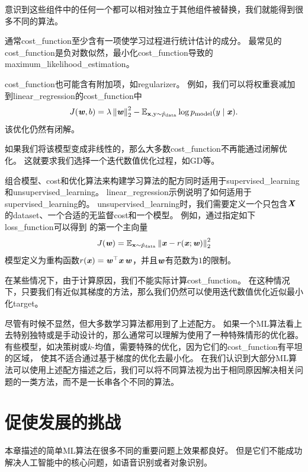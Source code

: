意识到这些组件中的任何一个都可以相对独立于其他组件被替换，我们就能得到很多不同的算法。


通常\gls{cost_function}至少含有一项使学习过程进行统计估计的成分。
最常见的\gls{cost_function}是负对数似然，最小化\gls{cost_function}导致的\gls{maximum_likelihood_estimation}。

\gls{cost_function}也可能含有附加项，如\gls{regularizer}。
例如，我们可以将权重衰减加到\gls{linear_regression}的\gls{cost_function}中
\begin{equation}
    J(\boldsymbol{\mathit{w}}, b) = \lambda \left\lVert\boldsymbol{\mathit{w}}\right\rVert_2^2 - \mathbb{E}_{\mathbf{x},\mathrm{y}\sim \hat{p}_{\text{data}}}
    \log p_{\text{model}} (y \mid \boldsymbol{\mathit{x}}) .
\end{equation}
该优化仍然有闭解。

如果我们将该模型变成非线性的，那么大多数\gls{cost_function}不再能通过闭解优化。
这就要求我们选择一个迭代数值优化过程，如\gls{GD}等。

组合模型、\gls{cost}和优化算法来构建学习算法的配方同时适用于\gls{supervised_learning}和\gls{unsupervised_learning}。
\gls{linear_regression}示例说明了如何适用于\gls{supervised_learning}的。
\gls{unsupervised_learning}时，我们需要定义一个只包含$\boldsymbol{\mathit{X}}$的\gls{dataset}、一个合适的无监督\gls{cost}和一个模型。
例如，通过指定如下\gls{loss_function}可以得到\,\,的第一个主向量
\begin{equation}
    J(\boldsymbol{\mathit{w}}) = \mathbb{E}_{\mathbf{x} \sim \hat{p}_{\text{data}}} \left\lVert\boldsymbol{\mathit{x}} - r(\boldsymbol{\mathit{x}}; \boldsymbol{\mathit{w}})\right\rVert_2^2
\end{equation}
模型定义为重构函数$r(\boldsymbol{\mathit{x}}) = \boldsymbol{\mathit{w}}^\top\boldsymbol{\mathit{x}} \,\boldsymbol{\mathit{w}}$，并且$\boldsymbol{\mathit{w}}$有范数为$1$的限制。

在某些情况下，由于计算原因，我们不能实际计算\gls{cost_function}。
在这种情况下，只要我们有近似其梯度的方法，那么我们仍然可以使用迭代数值优化近似最小化\gls{target}。

尽管有时候不显然，但大多数学习算法都用到了上述配方。
如果一个\gls{ML}算法看上去特别独特或是手动设计的，那么通常可以理解为使用了一种特殊情形的优化器。
有些模型，如决策树或$k$-均值，需要特殊的优化，因为它们的\gls{cost_function}有平坦的区域，
使其不适合通过基于梯度的优化去最小化。
在我们认识到大部分\gls{ML}算法可以使用上述配方描述之后，我们可以将不同算法视为出于相同原因解决相关问题的一类方法，而不是一长串各个不同的算法。


\section{促使发展的挑战}
\label{sec:challenges_motivating_deep_learning}
本章描述的简单\gls{ML}算法在很多不同的重要问题上效果都良好。
但是它们不能成功解决人工智能中的核心问题，如语音识别或者对象识别。

